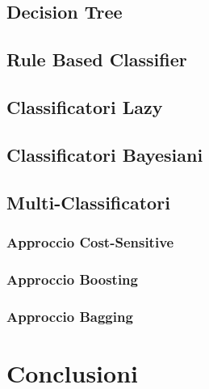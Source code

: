 

  
  
  \subsection{Decision Tree}
  \subsection{Rule Based Classifier}
  \subsection{Classificatori Lazy}
  \subsection{Classificatori Bayesiani}
  \subsection{Multi-Classificatori}
  \subsubsection{Approccio Cost-Sensitive}
  \subsubsection{Approccio Boosting}
  \subsubsection{Approccio Bagging}
  \section{Conclusioni}
  

